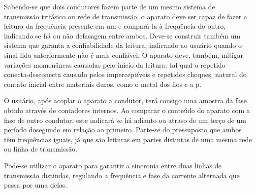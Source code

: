 \documentclass[12pt,a4paper,openany]{abntex2}
\begin{document}
Sabendo-se que dois condutores fazem parte de um mesmo sistema de transmissão trifásico ou rede de transmissão, o aparato deve ser capaz de fazer a leitura da frequência presente em um e compará-la à frequência do outro, indicando se há ou não defasagem entre ambos. Deve-se construir também um sistema que garanta a confiabilidade da leitura, indicando ao usuário quando o sinal lido anteriormente não é mais confiável. O aparato deve, também, mitigar variações momenâneas causadas pelo início da leitura, tal qual o repetido conecta-desconecta causado pelos imperceptíveis e repetidos choques, natural do contato inicial entre materiais duros, como o metal dos fios e a p.

O usuário, após acoplar o aparato a condutor, terá consigo uma amostra da fase obtido através de contadores internos. Ao comparar o conteúdo do aparato com a fase de outro condutor, este indicará se há adianto ou atraso de um terço de um período dosegundo em relação ao primeiro. Parte-se do pressuposto que ambos têm frequências iguais, já que são leituras em partes distintas de uma mesma rede ou linha de transmissão.

Pode-se utilizar o aparato para garantir a sincronia entre duas linhas de transmissão distindas, regulando a frequência e fase da corrente alternada que passa por uma delas.



\end{document}
